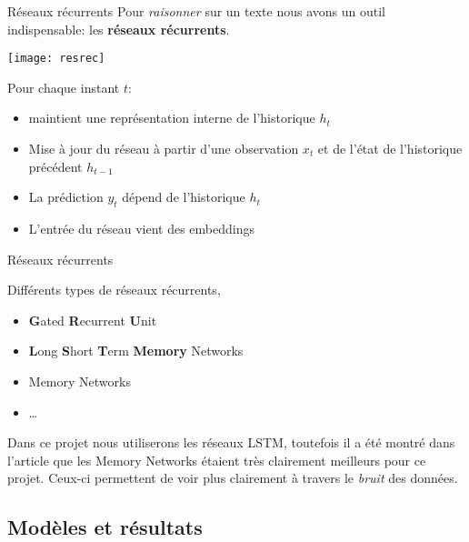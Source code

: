 \documentclass{beamer}
\theoremstyle{definition}
\begin{document}
\begin{frame}{Réseaux récurrents}
Pour \textit{raisonner} sur un texte nous avons un outil indispensable: les \textbf{réseaux récurrents}.

\vspace{0.2cm}

\begin{minipage}[c]{.46\linewidth}
\texttt{[image: resrec]}
\end{minipage}
\begin{minipage}[c]{.46\linewidth}
Pour chaque instant $t$:
\begin{itemize}
\item maintient une représentation interne de l'historique $h_t$
\item Mise à jour du réseau à partir d'une observation $x_t$ et de l'état de l'historique précédent $h_{t-1}$
\item La prédiction $y_t$ dépend de l'historique $h_t$
\item L'entrée du réseau vient des embeddings
\end{itemize}
\end{minipage}

\end{frame}

\begin{frame}{Réseaux récurrents}

Différents types de réseaux récurrents,

\begin{itemize}
\item \textbf{G}ated \textbf{R}ecurrent \textbf{U}nit
\item \textbf{L}ong \textbf{S}hort \textbf{T}erm \textbf{Memory} Networks
\item Memory Networks 
\item \ldots

\end{itemize}

\vspace{0.5cm}

Dans ce projet nous utiliserons les réseaux LSTM, toutefois il a été montré dans l'article\cite{1} que les Memory Networks étaient très clairement meilleurs pour ce projet. Ceux-ci permettent de voir plus clairement à travers le \textit{bruit} des données.
\end{frame}

\subsection{Modèles et résultats}
\end{document}
